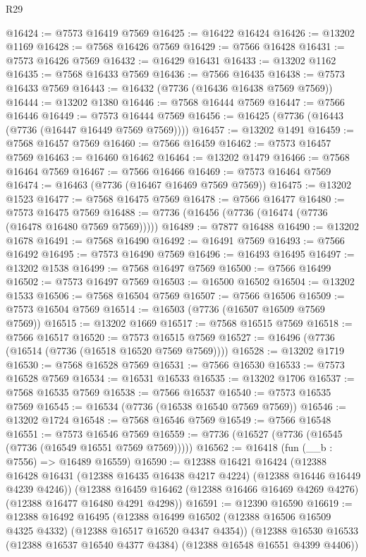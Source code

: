 \begin{lexlean}{R29}
\begin{coremodule}
@16424 := @7573 @16419 @7569
@16425 := @16422 @16424
@16426 := @13202 @1169
@16428 := @7568 @16426 @7569
@16429 := @7566 @16428
@16431 := @7573 @16426 @7569
@16432 := @16429 @16431
@16433 := @13202 @1162
@16435 := @7568 @16433 @7569
@16436 := @7566 @16435
@16438 := @7573 @16433 @7569
@16443 := @16432 (@7736 (@16436 @16438 @7569 @7569))
@16444 := @13202 @1380
@16446 := @7568 @16444 @7569
@16447 := @7566 @16446
@16449 := @7573 @16444 @7569
@16456 := @16425 (@7736 (@16443 (@7736 (@16447 @16449 @7569 @7569))))
@16457 := @13202 @1491
@16459 := @7568 @16457 @7569
@16460 := @7566 @16459
@16462 := @7573 @16457 @7569
@16463 := @16460 @16462
@16464 := @13202 @1479
@16466 := @7568 @16464 @7569
@16467 := @7566 @16466
@16469 := @7573 @16464 @7569
@16474 := @16463 (@7736 (@16467 @16469 @7569 @7569))
@16475 := @13202 @1523
@16477 := @7568 @16475 @7569
@16478 := @7566 @16477
@16480 := @7573 @16475 @7569
@16488 := @7736 (@16456 (@7736 (@16474 (@7736 (@16478 @16480 @7569 @7569)))))
@16489 := @7877 @16488
@16490 := @13202 @1678
@16491 := @7568 @16490
@16492 := @16491 @7569
@16493 := @7566 @16492
@16495 := @7573 @16490 @7569
@16496 := @16493 @16495
@16497 := @13202 @1538
@16499 := @7568 @16497 @7569
@16500 := @7566 @16499
@16502 := @7573 @16497 @7569
@16503 := @16500 @16502
@16504 := @13202 @1533
@16506 := @7568 @16504 @7569
@16507 := @7566 @16506
@16509 := @7573 @16504 @7569
@16514 := @16503 (@7736 (@16507 @16509 @7569 @7569))
@16515 := @13202 @1669
@16517 := @7568 @16515 @7569
@16518 := @7566 @16517
@16520 := @7573 @16515 @7569
@16527 := @16496 (@7736 (@16514 (@7736 (@16518 @16520 @7569 @7569))))
@16528 := @13202 @1719
@16530 := @7568 @16528 @7569
@16531 := @7566 @16530
@16533 := @7573 @16528 @7569
@16534 := @16531 @16533
@16535 := @13202 @1706
@16537 := @7568 @16535 @7569
@16538 := @7566 @16537
@16540 := @7573 @16535 @7569
@16545 := @16534 (@7736 (@16538 @16540 @7569 @7569))
@16546 := @13202 @1724
@16548 := @7568 @16546 @7569
@16549 := @7566 @16548
@16551 := @7573 @16546 @7569
@16559 := @7736 (@16527 (@7736 (@16545 (@7736 (@16549 @16551 @7569 @7569)))))
@16562 := @16418 (fun (__b : @7556) => @16489 @16559)
@16590 := @12388
    @16421
    @16424
    (@12388 @16428 @16431 (@12388 @16435 @16438 @4217 @4224) (@12388 @16446 @16449 @4239 @4246))
    (@12388 @16459 @16462 (@12388 @16466 @16469 @4269 @4276) (@12388 @16477 @16480 @4291 @4298))
@16591 := @12390 @16590
@16619 := @12388
    @16492
    @16495
    (@12388 @16499 @16502 (@12388 @16506 @16509 @4325 @4332) (@12388 @16517 @16520 @4347 @4354))
    (@12388 @16530 @16533 (@12388 @16537 @16540 @4377 @4384) (@12388 @16548 @16551 @4399 @4406))

\end{coremodule}
\end{lexlean}
